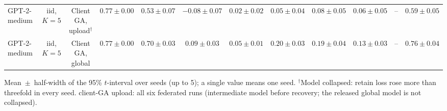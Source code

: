 {\begin{longtable}{@{\extracolsep{\fill}}lccccccccccc@{}}
GPT-2-medium & iid, $K=5$ & Client GA, upload$^{\dagger}$ & $0.77 \pm 0.00$ & $0.53 \pm 0.07$ & $-0.08 \pm 0.07$ & $0.02 \pm 0.02$ & $0.05 \pm 0.04$ & $0.08 \pm 0.05$ & $0.06 \pm 0.05$ & -- & $0.59 \pm 0.05$ \\
GPT-2-medium & iid, $K=5$ & Client GA, global & $0.77 \pm 0.00$ & $0.70 \pm 0.03$ & $0.09 \pm 0.03$ & $0.05 \pm 0.01$ & $0.20 \pm 0.03$ & $0.19 \pm 0.04$ & $0.13 \pm 0.03$ & -- & $0.76 \pm 0.04$ \\
\end{longtable}
Mean~$\pm$~half-width of the 95\% $t$-interval over seeds (up to 5); a single value means one seed. $^{\dagger}$Model collapsed: retain loss rose more than threefold in every seed. client-GA upload: all six federated runs (intermediate model before recovery; the released global model is not collapsed).\par
}
